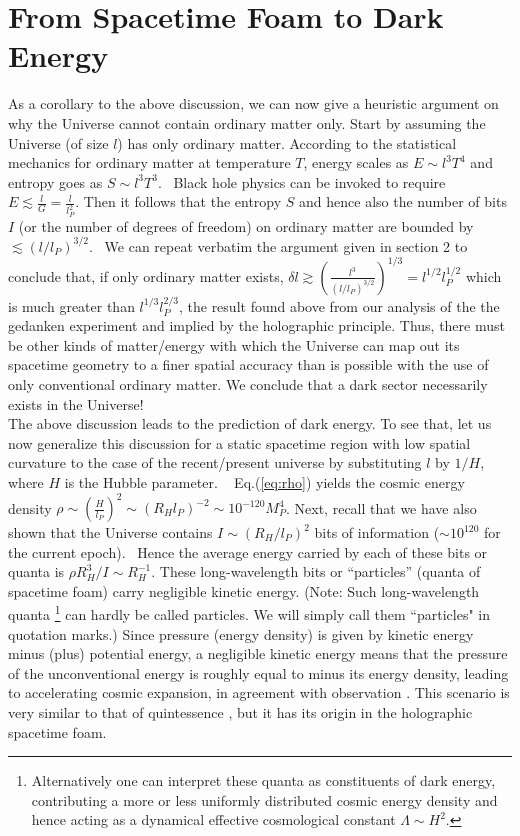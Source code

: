 \documentclass[12pt]{article}
\begin{document}
\section{From Spacetime Foam to Dark Energy}

As a corollary to the above discussion, we can now give a heuristic
argument \cite{llo04,Arzano,plb} 
on why the Universe cannot contain ordinary matter only.
Start by assuming the Universe (of size $l$) has only ordinary matter.
According to
the statistical mechanics for ordinary matter at temperature $T$, energy scales
as
$E \sim l^3 T^4$ and entropy goes as $S \sim l^3 T^3$.  Black hole physics can
be
invoked to require $E \lesssim \frac{l}{G} = \frac{l}{l_P^2}$.
Then it follows that the
entropy $S$ and hence also the number of bits $I$ (or the number of degrees of
freedom) on ordinary matter are bounded by
$\lesssim (l / l_P)^{3/2}$.  We can repeat verbatim
the argument given in section 2 to conclude that, if
only ordinary matter exists, $\delta l \gtrsim \left( \frac{l^3}{(l /
l_P)^{3/2}} \right) ^{1/3} =  l^{1/2} l_P^{1/2}$ which is much greater than
$l^{1/3} l_P^{2/3}$, the result found above from our analysis of the
the gedanken experiment and implied by the holographic principle. 
Thus, there must be other kinds of matter/energy with which the Universe can map
out its spacetime geometry to a finer spatial accuracy than is possible
with the use of only conventional ordinary matter.
We conclude that a dark sector necessarily exists in the Universe!\\

The above discussion leads to the prediction of dark energy.  To see that,
let us now generalize this discussion for a static spacetime region
with low spatial curvature to the case of the recent/present
universe by substituting $l$ by $1/H$, where $H$ is the Hubble parameter.
\cite{Arzano,plb}   Eq.(\ref{eq:rho})
yields the cosmic energy density $\rho \sim
  \left(\frac{H}{l_P}\right)^2 \sim (R_H l_P)^{-2} \sim 10^{-120} M_P^4$.
Next, recall that we have also shown that the Universe contains $I \sim (R_H/l_P)^2$ bits
of information ($\sim 10^{120}$ for the current epoch).\cite{Arzano}  Hence the
average energy carried by each of these bits or quanta is $\rho R_H^3/I \sim
R_H^{-1}$. These long-wavelength bits or ``particles'' (quanta of spacetime foam)
carry negligible kinetic energy. (Note:
Such long-wavelength quanta 
\footnote{Alternatively one can
interpret these quanta as constituents of dark
energy, contributing a more or less uniformly distributed cosmic energy density
and hence acting as a dynamical effective cosmological constant
$\Lambda \sim H^2.$}
can hardly be called particles. We will simply call
them ``particles" in quotation marks.)
Since pressure (energy density) is given by kinetic energy minus (plus)
potential energy, a negligible kinetic energy means that
the pressure of the unconventional energy is roughly equal to minus its
energy density, leading to accelerating cosmic expansion,
in agreement with observation \cite{SNa}.
This scenario is very similar to that of quintessence \cite{quint},
but it has its origin in the holographic spacetime foam. \cite{holocos,yjng05} \\
\end{document}
